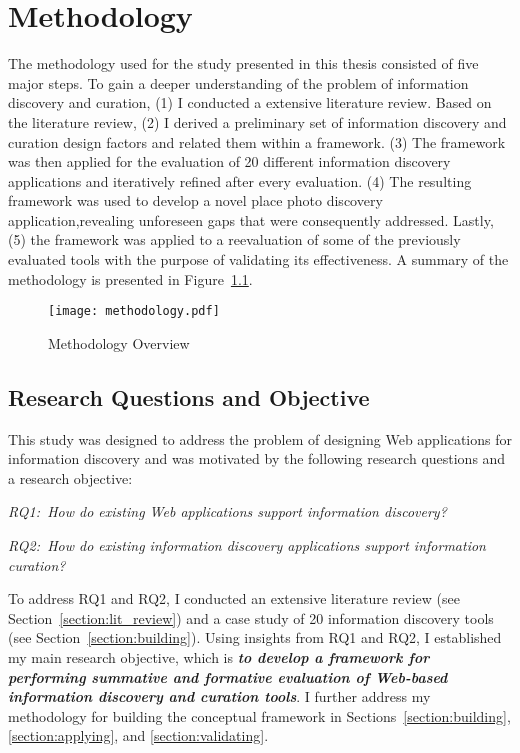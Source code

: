 \chapter{Methodology}
\label{chapter:methodology}

The methodology used for the study presented in this thesis consisted of five major steps. To gain a deeper understanding of the problem of information discovery and curation, (1) I conducted a extensive literature review. Based on the literature review, (2) I derived a preliminary set of information discovery and curation design factors and related them within a framework. (3) The framework was then applied for the evaluation of 20 different information discovery applications and iteratively refined after every evaluation. (4) The resulting framework was used to develop a novel place photo discovery application,revealing unforeseen gaps that were consequently addressed. Lastly, (5) the framework was applied to a reevaluation of some of the previously evaluated tools with the purpose of validating its effectiveness.  A summary of the methodology is presented in Figure~\ref{fig:methodology}.
\begin{figure}[ht!]
	\noindent
	\centering
    \texttt{[image: methodology.pdf]}
	\caption{Methodology Overview}
	\label{fig:methodology} 
\end{figure}

{\section{Research Questions and Objective}
This study was designed to address the problem of designing Web applications for information discovery and was motivated by the following research questions and a research objective:

\emph{RQ1:~How do existing Web applications support information discovery?}

\emph{RQ2:~How do existing information discovery applications support information curation?}

\pagebreak 

To address RQ1 and RQ2, I conducted an extensive literature review (see Section~\ref{section:lit_review}) and a case study of 20 information discovery tools (see Section~\ref{section:building}). Using insights from RQ1 and RQ2, I established my main research objective, which is \emph{\textbf{to develop a framework for performing summative and formative evaluation of Web-based information discovery and curation tools}}. I further address my methodology for building the conceptual framework in Sections~\ref{section:building}, \ref{section:applying}, and \ref{section:validating}.

}%

